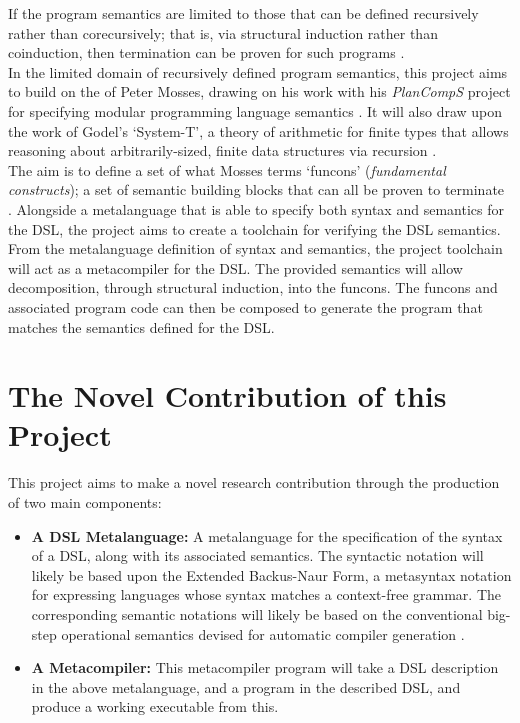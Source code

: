 \documentclass[a4paper,11pt]{report}
\begin{document}
If the program semantics are limited to those that can be defined recursively rather than corecursively; that is, via structural induction rather than coinduction, then termination can be proven for such programs \citep{nordstrom1988terminating}.\\

In the limited domain of recursively defined program semantics, this project aims to build on the of Peter Mosses, drawing on his work with his \textit{PlanCompS} project for specifying modular programming language semantics \cite{doh2001composing}.
It will also draw upon the work of Godel's `System-T', a theory of arithmetic for finite types that allows reasoning about arbitrarily-sized, finite data structures via recursion \cite{girard1989proofs,alves2010godel}.\\

The aim is to define a set of what Mosses terms `funcons' (\textit{fundamental constructs}); a set of semantic building blocks that can all be proven to terminate \cite{churchill2014reusable}.
Alongside a metalanguage that is able to specify both syntax and semantics for the DSL, the project aims to create a toolchain for verifying the DSL semantics.\\

From the metalanguage definition of syntax and semantics, the project toolchain will act as a metacompiler \cite{Mandell:1966:MDA:800267.810785} for the DSL.
The provided semantics will allow decomposition, through structural induction, into the funcons.
The funcons and associated program code can then be composed to generate the program that matches the semantics defined for the DSL.\\


\section{The Novel Contribution of this Project} %
\label{sec:the_novel_contribution_of_this_project}
This project aims to make a novel research contribution through the production of two main components:
\begin{itemize}
    \item \textbf{A DSL Metalanguage:} A metalanguage for the specification of the syntax of a DSL, along with its associated semantics. 
    The syntactic notation will likely be based upon the Extended Backus-Naur Form, a metasyntax notation for expressing languages whose syntax matches a context-free grammar. 
    The corresponding semantic notations will likely be based on the conventional big-step operational semantics \citep{Schmidt:2003:PLS:1074100.1074733} devised for automatic compiler generation \citep{diehl1996semantics}.
    \item \textbf{A Metacompiler:} This metacompiler program will take a DSL description in the above metalanguage, and a program in the described DSL, and produce a working executable from this. 
\end{itemize}
\end{document}
